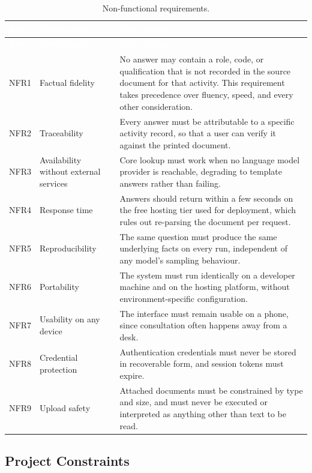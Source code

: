 \begin{longtable}{|p{}|p{}|p{}|}
\caption{Non-functional requirements.}\label{tab:nfr}\\
\hline
\rowcolor{thesisgreen}\textcolor{white}{\textbf{Ref.}} & \textcolor{white}{\textbf{Requirement}} & \textcolor{white}{\textbf{Description}} \\
\hline
\endfirsthead
\hline
\rowcolor{thesisgreen}\textcolor{white}{\textbf{Ref.}} & \textcolor{white}{\textbf{Requirement}} & \textcolor{white}{\textbf{Description}} \\
\hline
\endhead
NFR1 & Factual fidelity & No answer may contain a role, code, or qualification that is not recorded in the source document for that activity. This requirement takes precedence over fluency, speed, and every other consideration. \\ \hline
NFR2 & Traceability & Every answer must be attributable to a specific activity record, so that a user can verify it against the printed document. \\ \hline
NFR3 & Availability without external services & Core lookup must work when no language model provider is reachable, degrading to template answers rather than failing. \\ \hline
NFR4 & Response time & Answers should return within a few seconds on the free hosting tier used for deployment, which rules out re-parsing the document per request. \\ \hline
NFR5 & Reproducibility & The same question must produce the same underlying facts on every run, independent of any model's sampling behaviour. \\ \hline
NFR6 & Portability & The system must run identically on a developer machine and on the hosting platform, without environment-specific configuration. \\ \hline
NFR7 & Usability on any device & The interface must remain usable on a phone, since consultation often happens away from a desk. \\ \hline
NFR8 & Credential protection & Authentication credentials must never be stored in recoverable form, and session tokens must expire. \\ \hline
NFR9 & Upload safety & Attached documents must be constrained by type and size, and must never be executed or interpreted as anything other than text to be read. \\ \hline
\end{longtable}

\subsection{Project Constraints}

